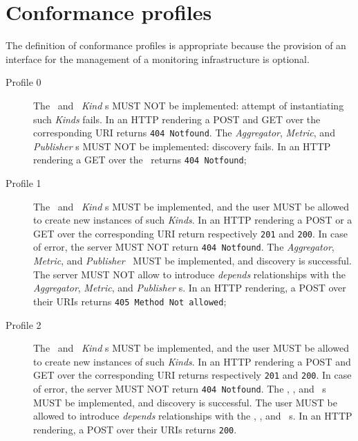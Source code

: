 \documentclass[10pt,a4paper]{article}
\begin{document}
\section{Conformance profiles}

The definition of conformance profiles is appropriate because the provision of an interface for the management of a monitoring infrastructure is optional. 

\begin{description}

\item[Profile 0] The \coll\ and \sens\ {\em Kind} s MUST NOT be implemented: attempt of instantiating such {\em Kinds} fails.  In an HTTP rendering a POST and GET over the corresponding URI returns {\tt 404 Notfound}. The {\em Aggregator}, {\em Metric}, and {\em Publisher} \mi s MUST NOT be implemented: discovery fails. In an HTTP rendering a GET over the \mi\ returns {\tt 404 Notfound}; 

\item[Profile 1] The \coll\ and \sens\ {\em Kind} s MUST be implemented, and the user MUST be allowed to create new instances of such {\em Kinds}.  In an HTTP rendering a POST or a GET over the corresponding URI return respectively {\tt 201} and {\tt 200}. In case of error, the server MUST NOT return {\tt 404 Notfound}. The {\em Aggregator}, {\em Metric}, and {\em Publisher} \mi\ MUST be implemented, and discovery is successful. The server MUST NOT allow to introduce {\em depends} relationships with the {\em Aggregator}, {\em Metric}, and {\em Publisher} \mi s. In an HTTP rendering, a POST over their URIs returns {\tt 405 Method Not allowed}; 

\item[Profile 2]  The \coll\ and \sens\ {\em Kind} s MUST be implemented, and the user MUST be allowed to create new instances of such {\em Kinds}.  In an HTTP rendering a POST and GET over the corresponding URI returns respectively {\tt 201} and {\tt 200}. In case of error, the server MUST NOT return {\tt 404 Notfound}. The \aggr , \metr , and \publ\ \mi s MUST be implemented, and discovery is successful. The user MUST be allowed to introduce {\em depends} relationships with the  \aggr , \metr , and \publ\ \mi s. In an HTTP rendering, a POST over their URIs returns {\tt 200}.

\end{description}
\end{document}
